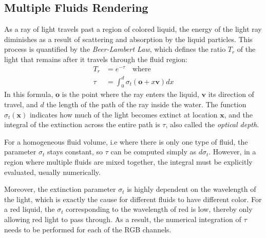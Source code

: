 \subsection{Multiple Fluids Rendering}

As a ray of light travels past a region of colored liquid, the energy of the light ray diminishes as a result of scattering and absorption by the liquid particles. This process is quantified by the \textit{Beer-Lambert Law}, which defines the ratio $T_r$ of the light that remains after it travels through the fluid region:
\begin{equation*}
    \begin{aligned}
        T_r &= e^{-\tau} \mbox{~~~where}\\
        \tau &= \int_0^{d} \sigma_t(\textbf{o}+x\textbf{v}) dx
    \end{aligned}
\end{equation*}
In this formula, $\textbf{o}$ is the point where the ray enters the liquid, $\textbf{v}$ its direction of travel, and $d$ the length of the path of the ray inside the water. The function $\sigma_t(\textbf{x})$ indicates how much of the light becomes extinct at location $\textbf{x}$, and the integral of the extinction across the entire path is $\tau$, also called the \textit{optical depth}.

For a homogeneous fluid volume, i.e where there is only one type of fluid, the parameter $\sigma_t$ stays constant, so $\tau$ can be computed simply as $d\sigma_t$. However, in a region where multiple fluids are mixed together, the integral must be explicitly evaluated, usually numerically.

Moreover, the extinction parameter $\sigma_t$ is highly dependent on the wavelength of the light, which is exactly the cause for different fluids to have different color. For a red liquid, the $\sigma_t$ corresponding to the wavelength of red is low, thereby only allowing red light to pass through. As a result, the numerical integration of $\tau$ needs to be performed for each of the RGB channels.

